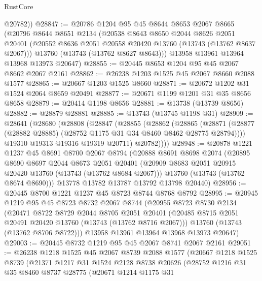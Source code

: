 \begin{lexlean}{RustCore}
\begin{coremodule}
        @20782))
@28847 := @20786
    @1204
    @95
    @45
    @8644
    @8653
    @2067
    @8665
    (@20796
      @8644
      @8651
      @2134
      (@20538
        @8643
        @8650
        @2044
        @8626
        @2051
        @20401
        (@20552 @8636 @2051 @20558 @20420 @13760 (@13743 (@13762 @8637 @2067)))
        @13760
        (@13743 (@13762 @8627 @8643)))
      @13958
      @13961
      @13964
      @13968
      @13973
      @20647)
@28855 := @20445 @8653 @1204 @95 @45 @2067 @8662 @2067 @2161
@28862 := @26238 @1203 @1525 @45 @2067 @8660 @2088 @1577
@28865 := @20667 @1203 @1525 @8660
@28871 := @20672 @1202 @31 @1524 @2064 @8659 @20491
@28877 := @20671 @1199 @1201 @31 @35 @8656 @8658
@28879 := @20414 @1198 @8656
@28881 := @13738 (@13739 @8656)
@28882 := @28879 @28881
@28885 := @13743 (@13745 @1198 @31)
@28909 := @28641
    (@28680
      (@28808
        (@28847
          (@28855
            (@28862
              (@28865
                (@28871 (@28877 (@28882 @28885) (@28752 @1175 @31 @34 @8460 @8462 @28775 @28794))))
              @19310
              @19313
              @19316
              @19319
              @20711)
            @20782))))
@28948 := @20878
    @1221
    @1237
    @45
    @8691
    @8700
    @2067
    @8794
    (@20888
      @8691
      @8698
      @2074
      (@20895
        @8690
        @8697
        @2044
        @8673
        @2051
        @20401
        (@20909 @8683 @2051 @20915 @20420 @13760 (@13743 (@13762 @8684 @2067)))
        @13760
        (@13743 (@13762 @8674 @8690)))
      @13778
      @13782
      @13787
      @13792
      @13798
      @20440)
@28956 := @20445 @8700 @1221 @1237 @45 @8723 @8744 @8768 @8792
@28995 := @20945
    @1219
    @95
    @45
    @8723
    @8732
    @2067
    @8744
    (@20955
      @8723
      @8730
      @2134
      (@20471
        @8722
        @8729
        @2044
        @8705
        @2051
        @20401
        (@20485 @8715 @2051 @20491 @20420 @13760 (@13743 (@13762 @8716 @2067)))
        @13760
        (@13743 (@13762 @8706 @8722)))
      @13958
      @13961
      @13964
      @13968
      @13973
      @20647)
@29003 := @20445 @8732 @1219 @95 @45 @2067 @8741 @2067 @2161
@29051 := @26238
    @1218
    @1525
    @45
    @2067
    @8739
    @2088
    @1577
    (@20667
      @1218
      @1525
      @8739
      (@21371
        @1217
        @31
        @1524
        @2128
        @8738
        @20626
        (@28752
          @1216
          @31
          @35
          @8460
          @8737
          @28775
          (@20671
            @1214
            @1175
            @31

\end{coremodule}
\end{lexlean}
